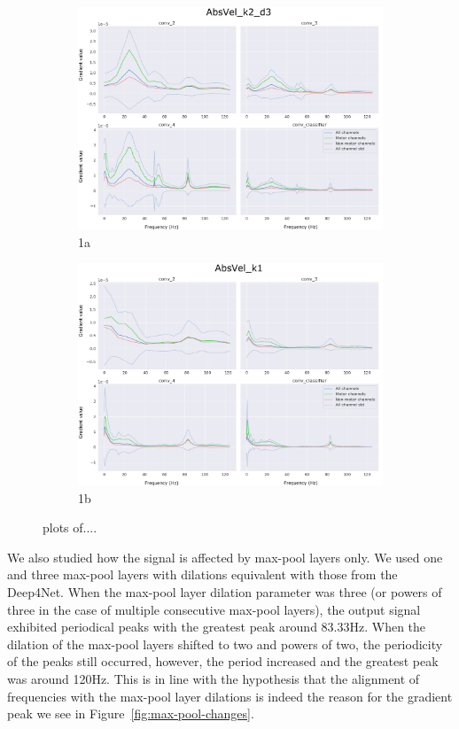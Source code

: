 \begin{figure}
\begin{subfigure}{.5\textwidth}
  \includegraphics[width=\linewidth]{img/ch4/absVel-k2-d3}
  \caption{1a}
  \label{fig:sfig1}
\end{subfigure}%
\begin{subfigure}{.5\textwidth}
  \centering
  \includegraphics[width=\linewidth]{img/ch4/absVel-k1}
  \caption{1b}
  \label{fig:sfig2}
\end{subfigure}
\caption{plots of....}
\label{fig:gradient-peak}
\end{figure}

We also studied how the signal is affected by max-pool layers only.
We used one and three max-pool layers with dilations equivalent with those from the Deep4Net.
When the max-pool layer dilation parameter was three (or powers of three in the case of multiple consecutive max-pool layers), the output signal exhibited periodical peaks with the greatest peak around 83.33Hz.
When the dilation of the max-pool layers shifted to two and powers of two, the periodicity of the peaks still occurred, however, the period increased and the greatest peak was around 120Hz.
This is in line with the hypothesis that the alignment of frequencies with the max-pool layer dilations is indeed the reason for the gradient peak we see in Figure~\ref{fig:max-pool-changes}.

